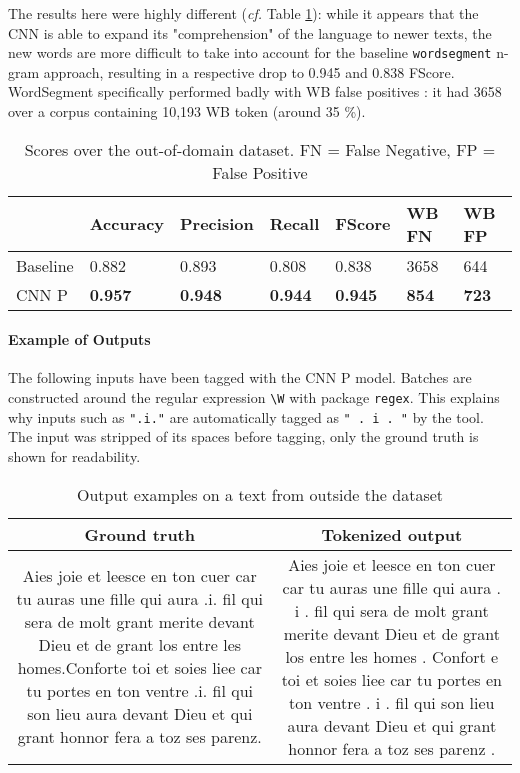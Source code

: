 \documentclass{jdmdh}
\begin{document}
The results here were highly different (\textit{cf.} Table \ref{tab:scores_unknown}): while it appears that the CNN is able to expand its "comprehension" of the language to newer texts, the new words are more difficult to take into account for the baseline \texttt{wordsegment} n-gram approach, resulting in a respective drop to 0.945 and 0.838 FScore. WordSegment specifically performed badly with WB false positives : it had 3658 over a corpus containing 10,193 WB token (around 35 \%).

\begin{table}[!ht]
\centering
\begin{tabular}{lllllll}
\hline
 & Accuracy & Precision & Recall & FScore & WB FN & WB FP \\ \hline
Baseline & 0.882 & 0.893 & 0.808 & 0.838 & 3658 & 644 \\
CNN P & \textbf{0.957} & \textbf{0.948} & \textbf{0.944} & \textbf{0.945} & \textbf{854} & \textbf{723} \\ \hline
\end{tabular}
\caption{Scores over the out-of-domain dataset. FN = False Negative, FP = False Positive}
\label{tab:scores_unknown}
\end{table}

\paragraph{Example of Outputs}

The following inputs have been tagged with the CNN P model. Batches are constructed around the regular expression \texttt{\textbackslash{}W} with package \texttt{regex}. This explains why inputs such as \texttt{".i."} are automatically tagged as \texttt{" . i . "} by the tool. The input was stripped of its spaces before tagging, only the ground truth is shown for readability.

\begin{table}[!ht]
\centering
\begin{tabularx}{\textwidth}{|C|C|}
\hline
\textbf{Ground truth} & \textbf{Tokenized output} \\\hline
Aies joie et leesce en ton cuer car tu auras une fille qui aura .i. fil qui sera de molt grant merite devant Dieu et de grant los entre les homes.Conforte toi et soies liee car tu portes en ton ventre .i. fil qui son lieu aura devant Dieu et qui grant honnor fera a toz ses parenz. & Aies joie et leesce en ton cuer car tu auras une fille qui aura .  i .  fil qui sera de molt grant merite devant Dieu et de grant los entre les homes .  Confort e toi et soies liee car tu portes en ton ventre .  i .  fil qui son lieu aura devant Dieu et qui grant honnor fera a toz ses parenz .
\\\hline
\end{tabularx}
\caption{Output examples on a text from outside the dataset}
\label{tab:example_output}
\end{table}
\end{document}
